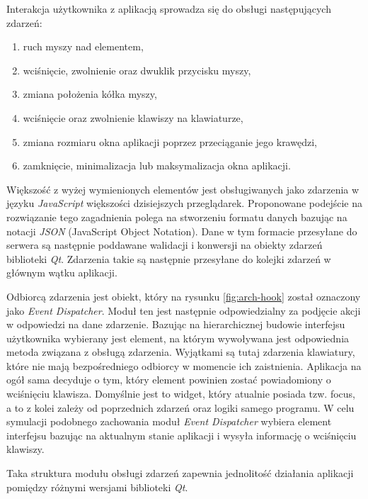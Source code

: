 Interakcja użytkownika z aplikacją sprowadza się do obsługi następujących zdarzeń:
\begin{enumerate}
  \item ruch myszy nad elementem,
  \item wciśnięcie, zwolnienie oraz dwuklik przycisku myszy,
  \item zmiana położenia kółka myszy,
  \item wciśnięcie oraz zwolnienie klawiszy na klawiaturze,
  \item zmiana rozmiaru okna aplikacji poprzez przeciąganie jego krawędzi,
  \item zamknięcie, minimalizacja lub maksymalizacja okna aplikacji.
\end{enumerate}
Większość z wyżej wymienionych elementów jest obsługiwanych jako zdarzenia w języku \emph{JavaScript} większości dzisiejszych przeglądarek. Proponowane podejście na rozwiązanie tego zagadnienia polega na stworzeniu formatu danych bazując na notacji \emph{JSON} (JavaScript Object Notation). Dane w tym formacie przesyłane do serwera są następnie poddawane walidacji i konwersji na obiekty zdarzeń biblioteki \emph{Qt}. Zdarzenia takie są następnie przesyłane do kolejki zdarzeń w głównym wątku aplikacji.

Odbiorcą zdarzenia jest obiekt, który na rysunku \ref{fig:arch-hook} został oznaczony jako \emph{Event Dispatcher}. Moduł ten jest następnie odpowiedzialny za podjęcie akcji w odpowiedzi na dane zdarzenie. Bazując na hierarchicznej budowie interfejsu użytkownika wybierany jest element, na którym wywoływana jest odpowiednia metoda związana z obsługą zdarzenia.
Wyjątkami są tutaj zdarzenia klawiatury, które nie mają bezpośredniego odbiorcy w momencie ich zaistnienia. Aplikacja na ogół sama decyduje o tym, który element powinien zostać powiadomiony o wciśnięciu klawisza. Domyślnie jest to widget, który atualnie posiada tzw. focus, a to z kolei zależy od poprzednich zdarzeń oraz logiki samego programu. W celu symulacji podobnego zachowania moduł \emph{Event Dispatcher} wybiera element interfejsu bazując na aktualnym stanie aplikacji i wysyła informację o wciśnięciu klawiszy.

Taka struktura modułu obsługi zdarzeń zapewnia jednolitość działania aplikacji pomiędzy różnymi wersjami biblioteki \emph{Qt}.